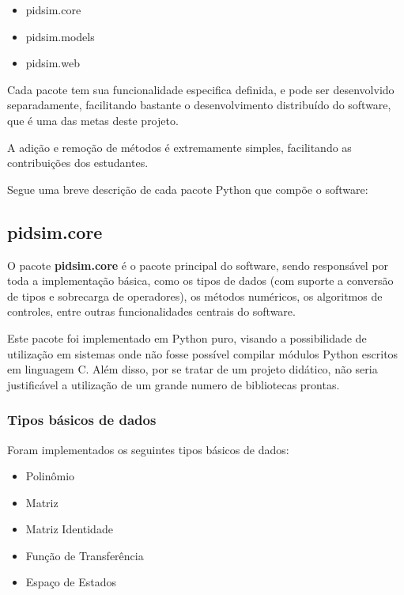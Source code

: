     \begin{itemize}
        \item pidsim.core
        \item pidsim.models
        \item pidsim.web
    \end{itemize}

    Cada pacote tem sua funcionalidade especifica definida, e pode ser desenvolvido
    separadamente, facilitando bastante o desenvolvimento distribuído do software,
    que é uma das metas deste projeto.

    A adição e remoção de métodos é extremamente simples, facilitando as contribuições
    dos estudantes.

    Segue uma breve descrição de cada pacote Python que compõe o software:

    \subsection{pidsim.core}

        O pacote \textbf{pidsim.core} é o pacote principal do software, sendo responsável
        por toda a implementação básica, como os tipos de dados (com suporte a conversão
        de tipos e sobrecarga de operadores), os métodos numéricos, os algoritmos de controles,
        entre outras funcionalidades centrais do software.

        Este pacote foi implementado em Python puro, visando a possibilidade de utilização
        em sistemas onde não fosse possível compilar módulos Python escritos em linguagem C.
        Além disso, por se tratar de um projeto didático, não seria justificável a utilização
        de um grande numero de bibliotecas prontas.

        \subsubsection{Tipos básicos de dados}

            Foram implementados os seguintes tipos básicos de dados:
        
            \begin{itemize}
                \item Polinômio
                \item Matriz
                \item Matriz Identidade
                \item Função de Transferência
                \item Espaço de Estados
            \end{itemize}

